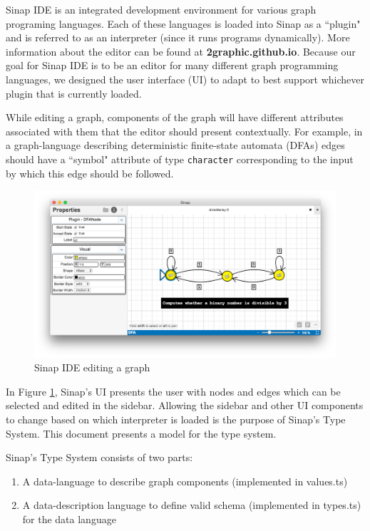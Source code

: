 \documentclass[12pt]{article}
\newcommand{\href}[2]{\textbf{#2}}
\begin{document}

Sinap IDE is an integrated development environment for various 
graph programing languages. Each of these 
languages is loaded into Sinap as a ``plugin" and is 
referred to as an interpreter (since it runs programs dynamically). 
More information 
about the editor can be found at 
\href{https://2graphic.github.io}{2graphic.github.io}.
Because our goal for Sinap IDE is to be an editor for many 
different graph programming languages, we designed the user interface (UI)
to adapt to best support whichever plugin that is currently loaded. 

While editing a graph, components of the
graph will have different attributes associated with them 
that the editor should present contextually. For example, in
a graph-language describing deterministic finite-state 
automata (DFAs) edges should have a ``symbol" attribute of 
type \texttt{character} corresponding to the input by which this 
edge should be followed. 

\begin{figure}
    \centering
    \includegraphics[width=.8\textwidth]{sinap-screenshot}
    \caption{Sinap IDE editing a graph}
    \label{sinap-screenshot}  
\end{figure}

In Figure \ref{sinap-screenshot}, Sinap's UI
presents the user with nodes and edges which can be selected 
and edited in the sidebar. Allowing the sidebar and other UI components to change based
on which interpreter is loaded is the purpose of Sinap's Type System. 
This document presents a model for the type system. 
    
Sinap's Type System consists of two parts:

\begin{enumerate}
    \item A data-language to describe graph components 
    (implemented in values.ts)
    \item A data-description language to define valid schema 
    (implemented in types.ts)
    for the data language
\end{enumerate}
\end{document}
